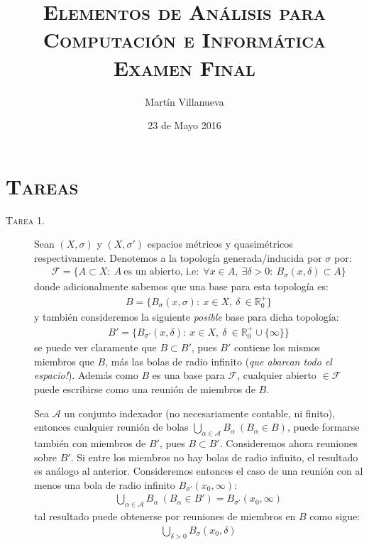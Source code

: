 \documentclass[spanish, fleqn]{article}
\title{\textsc{Elementos de Análisis para Computación e Informática} \\
	\textsc{Examen Final}}
\author{Martín Villanueva}
\date{23 de Mayo 2016}
\begin{document}
\maketitle


\section*{\textsc{Tareas}}


\begin{description}

	\item[\textsc{Tarea 1.}] Sean $(X , \sigma)$ y $(X, \sigma')$ espacios métricos y quasimétricos respectivamente. Denotemos a la topología generada/inducida por $\sigma$ por:
	\begin{align*}
		\mathcal{F} = \{ A \subset X: \ A \ \text{es un abierto, i.e:} \ \ \forall x \in A, \ \exists \delta>0: \ B_{\sigma}(x,\delta) \subset A \}
	\end{align*}
	donde adicionalmente sabemos que una base para esta topología es:
	\begin{align*}
		B = \{ B_{\sigma}(x, \sigma): \ x \in X, \ \delta \ \in \mathbb{R}_{0}^{+}  \}
	\end{align*}
	y también consideremos la siguiente \textit{posible} base para dicha topología:
	\begin{align*}
		B' = \{ B_{\sigma'}(x,\delta): \ x \in X, \ \delta \ \in  \mathbb{R}_{0}^{+} \cup \{ \infty \} \}
	\end{align*}
	se puede ver claramente que $B \subset B'$, pues $B'$ contiene los mismos miembros que $B$, más las bolas de radio infinito (\textit{que abarcan todo el espacio!}). Además como $B$ es una base para $\mathcal{F}$, cualquier abierto $\in \mathcal{F}$ puede escribirse como una reunión de miembros de $B$.

	Sea $\mathcal{A}$ un conjunto indexador (no necesariamente contable, ni finito), entonces cualquier reunión de bolas \newline $ \bigcup_{\alpha \in \mathcal{A}} B_{\alpha}  \ (B_{\alpha} \in B)$, puede formarse también con miembros de $B'$, pues $B \subset B'$. 
	Consideremos ahora reuniones sobre $B'$. Si entre los miembros no hay bolas de radio infinito, el resultado es análogo 
	al anterior. Consideremos entonces el caso de una reunión con al menos una bola de radio infinito $B_{\sigma'}(x_0, \infty)$:
	\begin{align*}
		\bigcup_{\alpha \in \mathcal{A}} B_{\alpha} \ (B_{\alpha} \in B') = B_{\sigma'}(x_0, \infty)
	\end{align*}
	tal resultado puede obtenerse por reuniones de miembros en $B$ como sigue:
	\begin{align*}
		\bigcup_{\delta > 0} B_{\sigma}(x_0, \delta)
	\end{align*}


\end{description}
\end{document}
